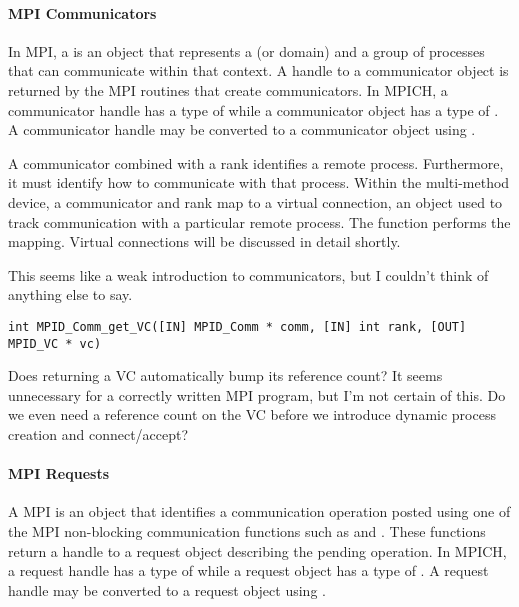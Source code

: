 \paragraph{MPI Communicators}

In MPI, a  is an object that represents a
 (or domain) and a group of processes that can
communicate within that context.  A handle to a communicator object is returned
by the MPI routines that create communicators.  In MPICH, a communicator handle
has a type of  while a communicator object has a type of
.  A communicator handle may be converted to a communicator
object using .

A communicator combined with a rank identifies a remote process.  Furthermore,
it must identify how to communicate with that process.  Within the multi-method
device, a communicator and rank map to a virtual connection, an object used to
track communication with a particular remote process.  The function
 performs the mapping.  Virtual connections will be
discussed in detail shortly.

\begin{cmt}[BRT]
  This seems like a weak introduction to communicators, but I couldn't think of
  anything else to say.
\end{cmt}

\begin{verbatim}
int MPID_Comm_get_VC([IN] MPID_Comm * comm, [IN] int rank, [OUT] MPID_VC * vc)
\end{verbatim}

\begin{cmt}[BRT]
  Does returning a VC automatically bump its reference count?  It seems
  unnecessary for a correctly written MPI program, but I'm not certain of this.
  Do we even need a reference count on the VC before we introduce dynamic
  process creation and connect/accept?
\end{cmt}


\paragraph{MPI Requests}

A MPI  is an object that identifies a communication operation
posted using one of the MPI non-blocking communication functions such as
 and .  These functions return a handle to a
request object describing the pending operation.  In MPICH, a request handle
has a type of  while a request object has a type of
.  A request handle may be converted to a request object
using .

